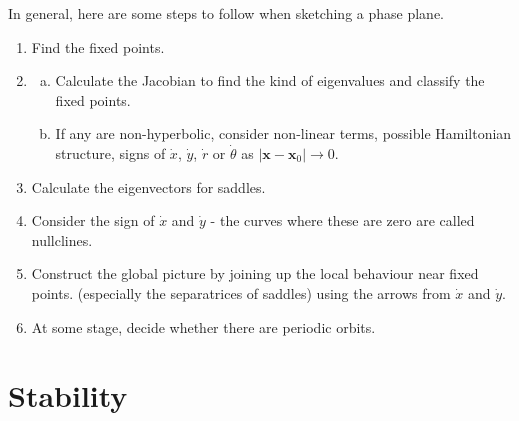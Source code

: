\documentclass{article}
\begin{document}
\noindent In general, here are some steps to follow when sketching a phase plane.
\begin{enumerate}[1.]
\item Find the fixed points.
\item \begin{enumerate}[(a)] \item Calculate the Jacobian to find the kind of eigenvalues and classify
				the fixed points.
				\item If any are non-hyperbolic, consider non-linear terms, possible
				Hamiltonian structure, signs of $\dot{x}$, $\dot{y}$, $\dot{r}$ or 
				$\dot{\theta}$ as $|\bm{x} - \bm{x}_0| \to 0$.
      \end{enumerate}
\item Calculate the eigenvectors for saddles.
\item Consider the sign of $\dot{x}$ and $\dot{y}$ - the curves where these are
zero are called nullclines.
\item Construct the global picture by joining up the local behaviour near fixed
points. (especially the separatrices of saddles) using the arrows from $\dot{x}$
and $\dot{y}$.
\item At some stage, decide whether there are periodic orbits.
\end{enumerate}
%
%
%
\section{Stability}
\end{document}
